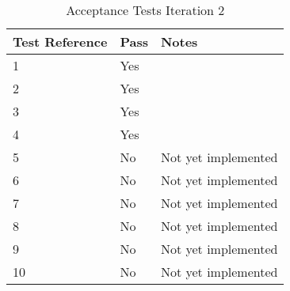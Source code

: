 \begin{table}[h]
\centering
\small
\begin{tabular}{lll}
\hline
\textbf{Test Reference} & \textbf{Pass} & \textbf{Notes} \\ \hline
1              & Yes              &                \\ 
2              & Yes              &                \\ 
3              & Yes              &                \\ 
4              & Yes              &                \\ 
5              & No              & Not yet implemented               \\ 
6              & No              & Not yet implemented               \\ 
7              & No              & Not yet implemented               \\ 
8              & No              & Not yet implemented               \\ 
9              & No              & Not yet implemented               \\ 
10             & No              & Not yet implemented               \\ \hline
\end{tabular}
\caption{Acceptance Tests Iteration 2 \protect {\label{tab:acc_test_1}}}
\end{table}